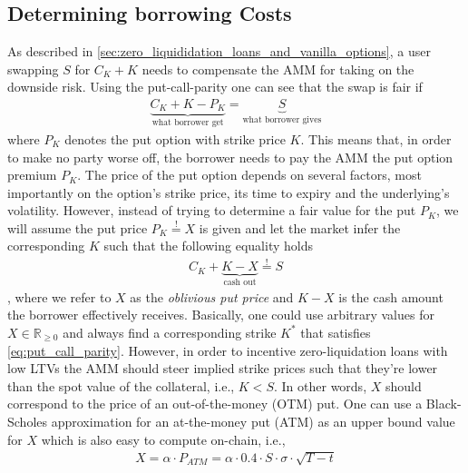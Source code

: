 \documentclass[a4paper]{article}
\begin{document}
\subsection{Determining borrowing Costs}
\label{sec:borrowing_costs}
As described in \cref{sec:zero_liquididation_loans_and_vanilla_options}, a user swapping $S$ for $C_K+K$ needs to compensate the AMM for taking on the downside risk. Using the put-call-parity one can see that the swap is fair if
\begin{equation}
\label{eq:put_call_parity}
\begin{split}
\underbrace{C_K+K-P_K}_{\textrm{what borrower get}} = \underbrace{S}_{\textrm{what borrower gives}}
\end{split}
\end{equation}
where $P_K$ denotes the put option with strike price $K$. This means that, in order to make no party worse off, the borrower needs to pay the AMM the put option premium $P_K$. The price of the put option depends on several factors, most importantly on the option's strike price, its time to expiry and the underlying's volatility. However, instead of trying to determine a fair value for the put $P_K$, we will assume the put price $P_K\stackrel{!}{=}X$ is given and let the market infer the corresponding $K$ such that the following equality holds
\begin{equation}
\label{eq:put_call_parity}
\begin{split}
C_K+ \underbrace{K-X}_{\textrm{cash out}} \stackrel{!}{=} S
\end{split}
\end{equation}
, where we refer to $X$ as the \emph{oblivious put price} and $K-X$ is the cash amount the borrower effectively receives. Basically, one could use arbitrary values for $X\in \mathbb R_{\ge 0}$ and always find a corresponding strike $K^*$ that satisfies \cref{eq:put_call_parity}. However, in order to incentive zero-liquidation loans with low LTVs the AMM should steer implied strike prices such that they're lower than the spot value of the collateral, i.e., $K<S$. In other words, $X$ should correspond to the price of an out-of-the-money (OTM) put. One can use a Black-Scholes approximation for an at-the-money put (ATM) as an upper bound value for $X$ which is also easy to compute on-chain, i.e.,
\begin{equation}
\begin{split}
\label{eq:oblivious_put_price}
X = \alpha \cdot  P_{ATM} = \alpha \cdot 0.4 \cdot  S \cdot \sigma \cdot \sqrt{T-t}
\end{split}
\end{equation}
\end{document}
